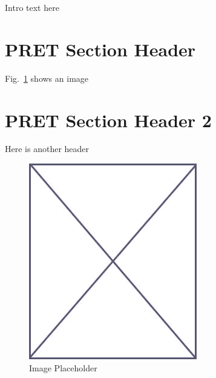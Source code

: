 Intro text here

\section{PRET Section Header}
\label{pret_sec_1}

Fig.~\ref{fig:placeholder_pret} shows an image

\section{PRET Section Header 2}
\label{pret_sec_2}

Here is another header


\begin{figure}
\begin{center}
\vspace{-32pt}
\includegraphics[scale=.45]{figs/placeholder}
\end{center}
\vspace{-12pt}
\caption{Image Placeholder}
\label{fig:placeholder_pret}
\end{figure}
